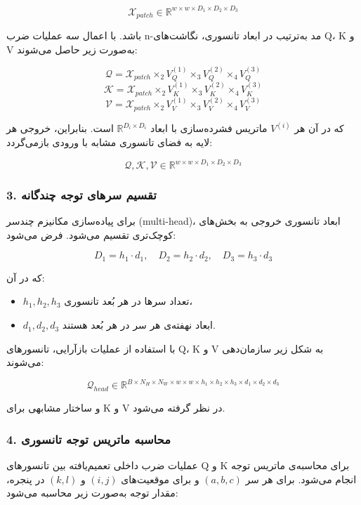 \[
\mathcal{X}_{patch} \in \mathbb{R}^{w \times w \times D_1 \times D_2 \times D_3}
\]

باشد. با اعمال سه عملیات ضرب n-مد به‌ترتیب در ابعاد تانسوری، نگاشت‌های Q، K و V به‌صورت زیر حاصل می‌شوند:

\[
\mathcal{Q} = \mathcal{X}_{patch} \times_2 V_Q^{(1)} \times_3 V_Q^{(2)} \times_4 V_Q^{(3)}
\]
\[
\mathcal{K} = \mathcal{X}_{patch} \times_2 V_K^{(1)} \times_3 V_K^{(2)} \times_4 V_K^{(3)}
\]
\[
\mathcal{V} = \mathcal{X}_{patch} \times_2 V_V^{(1)} \times_3 V_V^{(2)} \times_4 V_V^{(3)}
\]

که در آن هر $V^{(i)}$ ماتریس فشرده‌سازی با ابعاد $\mathbb{R}^{D_i \times D_i}$ است. بنابراین، خروجی هر لایه به فضای تانسوری مشابه با ورودی بازمی‌گردد:

\[
\mathcal{Q}, \mathcal{K}, \mathcal{V} \in \mathbb{R}^{w \times w \times D_1 \times D_2 \times D_3}
\]

\subsubsection*{3. تقسیم سرهای توجه چندگانه}

برای پیاده‌سازی مکانیزم چندسر (multi-head)، ابعاد تانسوری خروجی به بخش‌های کوچک‌تری تقسیم می‌شود. فرض می‌شود:

\[
D_1 = h_1 \cdot d_1, \quad D_2 = h_2 \cdot d_2, \quad D_3 = h_3 \cdot d_3
\]

که در آن:
\begin{itemize}
	\item $h_1, h_2, h_3$ تعداد سرها در هر بُعد تانسوری،
	\item $d_1, d_2, d_3$ ابعاد نهفته‌ی هر سر در هر بُعد هستند.
\end{itemize}

با استفاده از عملیات بازآرایی، تانسورهای Q، K و V به شکل زیر سازمان‌دهی می‌شوند:

\[
\mathcal{Q}_{head} \in \mathbb{R}^{B \times N_H \times N_W \times w \times w \times h_1 \times h_2 \times h_3 \times d_1 \times d_2 \times d_3}
\]

و ساختار مشابهی برای K و V در نظر گرفته می‌شود.

\subsubsection*{4. محاسبه ماتریس توجه تانسوری}

عملیات ضرب داخلی تعمیم‌یافته بین تانسورهای Q و K برای محاسبه‌ی ماتریس توجه انجام می‌شود. برای هر سر $(a,b,c)$ و برای موقعیت‌های $(i,j)$ و $(k,l)$ در پنجره، مقدار توجه به‌صورت زیر محاسبه می‌شود:


